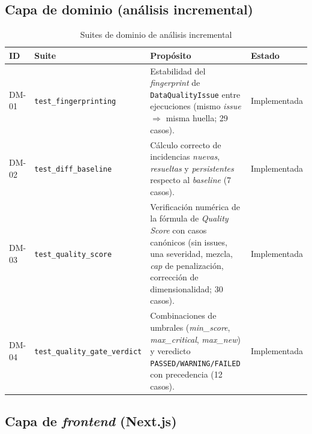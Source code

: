 \subsection{Capa de dominio (análisis incremental)}

\begin{table}[H]
  \centering
  \small
  \caption{Suites de dominio de análisis incremental}
  \label{tab:suites-dominio}
  \begin{tabularx}{\textwidth}{l >{\hsize=0.7\hsize}X >{\hsize=1.3\hsize}X l}
    \toprule
    \textbf{ID} & \textbf{Suite} & \textbf{Propósito} & \textbf{Estado} \\
    \midrule
    DM-01 & \texttt{test\_fingerprinting} &
      Estabilidad del \emph{fingerprint} de \texttt{DataQualityIssue} entre
      ejecuciones (mismo \emph{issue} $\Rightarrow$ misma huella; 29 casos).
      & Implementada \\
    DM-02 & \texttt{test\_diff\_baseline} &
      Cálculo correcto de incidencias \emph{nuevas}, \emph{resueltas} y
      \emph{persistentes} respecto al \emph{baseline} (7 casos).
      & Implementada \\
    DM-03 & \texttt{test\_quality\_score} &
      Verificación numérica de la fórmula de \emph{Quality Score} con
      casos canónicos (sin issues, una severidad, mezcla, \emph{cap} de
      penalización, corrección de dimensionalidad; 30 casos).
      & Implementada \\
    DM-04 & \texttt{test\_quality\_gate\_verdict} &
      Combinaciones de umbrales (\emph{min\_score}, \emph{max\_critical},
      \emph{max\_new}) y veredicto \texttt{PASSED/WARNING/FAILED} con
      precedencia (12 casos).
      & Implementada \\
    \bottomrule
  \end{tabularx}
\end{table}

\subsection{Capa de \emph{frontend} (Next.js)}

